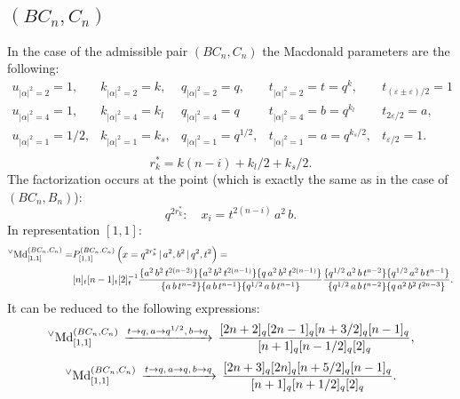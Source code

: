 \documentclass{article}
\def\nn{\nonumber}
\def\MDv{{^\vee\hbox{Md}}}
\def\nn{\nonumber}
\def\ve{\varepsilon}
\begin{document}
\subsection{$(BC_n, C_n)$}
In the case of the admissible pair $(BC_n, C_n)$ the Macdonald parameters are the following:
\begin{equation}
    \begin{array}{lllll}
   u_{|\alpha|^2 = 2} = 1, &  k_{|\alpha|^2 = 2} = k,  &    q_{|\alpha|^2 = 2} = q, & t_{|\alpha|^2 = 2} =t= q^k , & t_{(\varepsilon\pm\varepsilon)/2} = 1 \\
      u_{|\alpha|^2 = 4} = 1, & k_{|\alpha|^2 = 4} = k_l &    q_{|\alpha|^2 = 4} = q&  t_{|\alpha|^2 = 4} = b=q^{k_l} & t_{2\varepsilon/2} = a,\\
       u_{|\alpha|^2 = 1} = 1/2, & k_{|\alpha|^2 = 1} = k_s, &    q_{|\alpha|^2 = 1} = q^{1/2},&  t_{|\alpha|^2 = 1} = a=q^{k_s/2}, & t_{\ve/2} = 1. \\
    \end{array}
\end{equation}
\begin{equation}
    r_k^* = k(n-i) +k_l/2+k_s/2.
\end{equation}
The factorization occurs at the point (which is exactly the same as in the case of $(BC_n,B_n)$):
\begin{equation}
    q^{2r^*_k}: \quad x_i = t^{2(n-i)}\, a^2 \, b.
\end{equation}
In representation $[1,1]$:
\begin{align}
 \MDv_{[1,1]}^{(BC_n,C_n)} = & P_{[1,1]}^{(BC_n,C_n)} \left(x = q^{2r_k^*}\,|\, a^2, b^2\,|\,q^2,t^2 \right) = \\ \nn &   [n]_t[n-1]_t[2]_t^{-1} \frac{\{a^2 \,b^2\, t^{2(n-2)}\} \{a^2\, b^2\, t^{2(n-1)}\} \{q\,a^2\,b^2\,t^{2(n-1)}\}}{\{a \,b\, t^{n-2}\} \{a\, b\, t^{n-1}\}\{q^{1/2}\,a\,b\,t^{n-1}\}} \frac{
   \{q^{1/2}\,a^2\, b\, t^{n-2}\} \{q^{1/2}\,a^2 \,b\, t^{n-1}\}}{
   \{q^{1/2 } \,a \, b\, t^{n-2}\} \{q\,a^2\, b^2 \,t^{2
   n-3}\}}.
\end{align}
It can be reduced to the following expressions:
 \begin{equation}
    \MDv_{[1,1]}^{(BC_n,C_n)} \,\xrightarrow[]{t\rightarrow q,\, a \rightarrow q^{1/2},\, b \rightarrow q} \, \frac{[2n+2]_q[2n-1]_q[n+3/2]_q[n-1]_q}{[n+1]_q[n-1/2]_q[2]_q},
\end{equation}
 \begin{equation}
      \MDv_{[1,1]}^{(BC_n,C_n)} \,\xrightarrow[]{t\rightarrow q,\, a \rightarrow q,\, b \rightarrow q} \, \frac{[2n+3]_q[2n]_q[n+5/2]_q[n-1]_q}{[n+1]_q[n+1/2]_q[2]_q}.
\end{equation}
\end{document}
